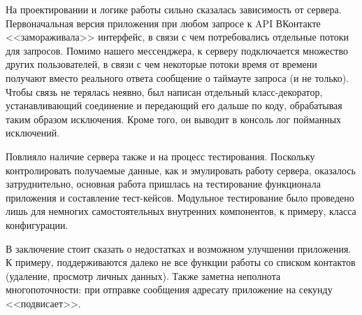 \documentclass[12pt]{article}
\begin{document}
На проектировании и логике работы сильно сказалась зависимость от сервера. Первоначальная версия приложения при любом запросе к API ВКонтакте <<замораживала>> интерфейс, в связи с чем потребовались отдельные потоки для запросов. Помимо нашего мессенджера, к серверу подключается множество других пользователей, в связи с чем некоторые потоки время от времени получают вместо реального ответа сообщение о таймауте запроса (и не только). Чтобы связь не терялась неявно, был написан отдельный класс-декоратор, устанавливающий соединение и передающий его дальше по коду, обрабатывая таким образом исключения. Кроме того, он выводит в консоль лог пойманных исключений. \newline

Повлияло наличие сервера также и на процесс тестирования. Поскольку контролировать получаемые данные, как и эмулировать работу сервера, оказалось затруднительно, основная работа пришлась на тестирование функционала приложения и составление тест-кейсов. Модульное тестирование было проведено лишь для немногих самостоятельных внутренних компонентов, к примеру, класса конфигурации. \newline

В заключение стоит сказать о недостатках и возможном улучшении приложения. К примеру, поддерживаются далеко не все функции работы со списком контактов (удаление, просмотр личных данных). Также заметна неполнота многопоточности: при отправке сообщения адресату приложение на секунду <<подвисает>>.
\end{document}
